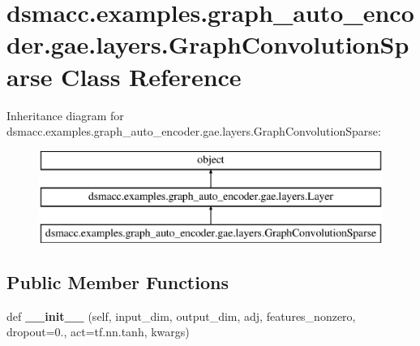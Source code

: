\hypertarget{classdsmacc_1_1examples_1_1graph__auto__encoder_1_1gae_1_1layers_1_1GraphConvolutionSparse}{}\section{dsmacc.\+examples.\+graph\+\_\+auto\+\_\+encoder.\+gae.\+layers.\+Graph\+Convolution\+Sparse Class Reference}
\label{classdsmacc_1_1examples_1_1graph__auto__encoder_1_1gae_1_1layers_1_1GraphConvolutionSparse}
Inheritance diagram for dsmacc.\+examples.\+graph\+\_\+auto\+\_\+encoder.\+gae.\+layers.\+Graph\+Convolution\+Sparse\+:\begin{figure}[H]
\begin{center}
\leavevmode
\includegraphics[height=3.000000cm]{classdsmacc_1_1examples_1_1graph__auto__encoder_1_1gae_1_1layers_1_1GraphConvolutionSparse}
\end{center}
\end{figure}
\subsection*{Public Member Functions}
\begin{DoxyCompactItemize}
\item 
\mbox{\label{classdsmacc_1_1examples_1_1graph__auto__encoder_1_1gae_1_1layers_1_1GraphConvolutionSparse_a84ffd20d1f835e84f90147cf0e0981fd}} 
def {\bfseries \+\_\+\+\_\+init\+\_\+\+\_\+} (self, input\+\_\+dim, output\+\_\+dim, adj, features\+\_\+nonzero, dropout=0., act=tf.\+nn.\+tanh, kwargs)
\end{DoxyCompactItemize}
